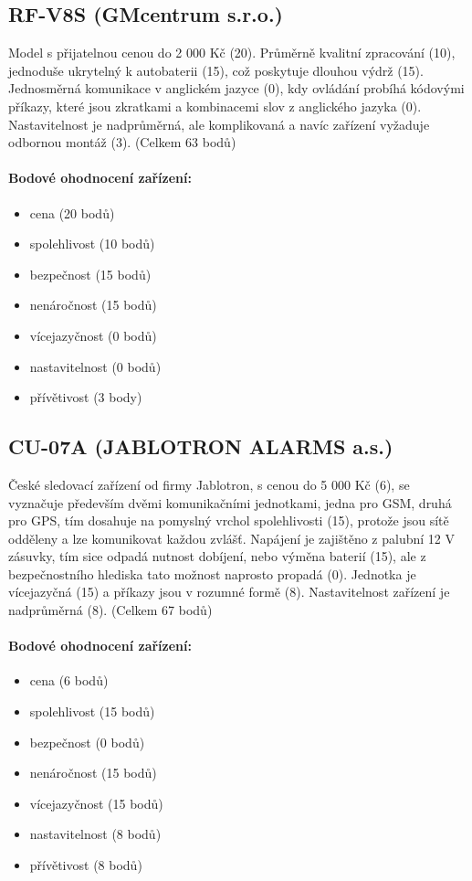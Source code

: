 \documentclass[FM,MP]{tulthesis}  %
\begin{document}
\subsection{RF-V8S (GMcentrum s.r.o.)}
Model s přijatelnou cenou do 2 000 Kč (20). Průměrně kvalitní zpracování (10), jednoduše ukrytelný k autobaterii (15), což poskytuje dlouhou výdrž (15). Jednosměrná komunikace v anglickém jazyce (0), kdy ovládání probíhá kódovými příkazy, které jsou zkratkami a kombinacemi slov z anglického jazyka (0). Nastavitelnost je nadprůměrná, ale komplikovaná a navíc zařízení vyžaduje odbornou montáž (3). (Celkem 63 bodů)

\paragraph{Bodové ohodnocení zařízení:}
\begin{itemize}
\item cena (20 bodů)
\item spolehlivost (10 bodů)
\item bezpečnost (15 bodů)
\item nenáročnost (15 bodů)
\item vícejazyčnost (0 bodů)
\item nastavitelnost (0 bodů)
\item přívětivost (3 body)
\end{itemize}

\subsection{CU-07A (JABLOTRON ALARMS a.s.)}
České sledovací zařízení od firmy Jablotron, s cenou do 5 000 Kč (6), se vyznačuje především dvěmi komunikačními jednotkami, jedna pro GSM, druhá pro GPS, tím dosahuje na pomyslný vrchol spolehlivosti (15), protože jsou sítě odděleny a lze komunikovat každou zvlášť. Napájení je zajištěno z palubní 12 V zásuvky, tím sice odpadá nutnost dobíjení, nebo výměna baterií (15), ale z bezpečnostního hlediska tato možnost naprosto propadá (0). Jednotka je vícejazyčná (15) a příkazy jsou v rozumné formě (8). Nastavitelnost zařízení je nadprůměrná (8). (Celkem 67 bodů)

\paragraph{Bodové ohodnocení zařízení:}
\begin{itemize}
\item cena (6 bodů)
\item spolehlivost (15 bodů)
\item bezpečnost (0 bodů)
\item nenáročnost (15 bodů)
\item vícejazyčnost (15 bodů)
\item nastavitelnost (8 bodů)
\item přívětivost (8 bodů)
\end{itemize}
\end{document}
